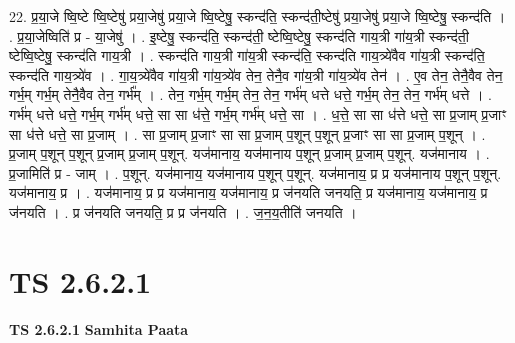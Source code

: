 \documentclass[17pt]{extarticle}
\begin{document}
22. प्र॒या॒जे ष्वि॒ष्टे ष्वि॒ष्टेषु॑ प्रया॒जेषु॑ प्रया॒जे ष्वि॒ष्टेषु॒ स्कन्द॑ति॒ स्कन्द॑ती॒ष्टेषु॑ प्रया॒जेषु॑ प्रया॒जे ष्वि॒ष्टेषु॒ स्कन्द॑ति । . प्र॒या॒जेष्विति॑ प्र - या॒जेषु॑ । . इ॒ष्टेषु॒ स्कन्द॑ति॒ स्कन्द॑ती॒ ष्टेष्वि॒ष्टेषु॒ स्कन्द॑ति गाय॒त्री गा॑य॒त्री स्कन्द॑ती॒ ष्टेष्वि॒ष्टेषु॒ स्कन्द॑ति गाय॒त्री । . स्कन्द॑ति गाय॒त्री गा॑य॒त्री स्कन्द॑ति॒ स्कन्द॑ति गाय॒त्र्ये॑वैव गा॑य॒त्री स्कन्द॑ति॒ स्कन्द॑ति गाय॒त्र्ये॑व । . गा॒य॒त्र्ये॑वैव गा॑य॒त्री गा॑य॒त्र्ये॑व तेन॒ तेनै॒व गा॑य॒त्री गा॑य॒त्र्ये॑व तेन॑ । . ए॒व तेन॒ तेनै॒वैव तेन॒ गर्भ॒म् गर्भ॒म् तेनै॒वैव तेन॒ गर्भ᳚म् । . तेन॒ गर्भ॒म् गर्भ॒म् तेन॒ तेन॒ गर्भ॑म् धत्ते धत्ते॒ गर्भ॒म् तेन॒ तेन॒ गर्भ॑म् धत्ते । . गर्भ॑म् धत्ते धत्ते॒ गर्भ॒म् गर्भ॑म् धत्ते॒ सा सा ध॑त्ते॒ गर्भ॒म् गर्भ॑म् धत्ते॒ सा । . ध॒त्ते॒ सा सा ध॑त्ते धत्ते॒ सा प्र॒जाम् प्र॒जाꣳ सा ध॑त्ते धत्ते॒ सा प्र॒जाम् । . सा प्र॒जाम् प्र॒जाꣳ सा सा प्र॒जाम् प॒शून् प॒शून् प्र॒जाꣳ सा सा प्र॒जाम् प॒शून् । . प्र॒जाम् प॒शून् प॒शून् प्र॒जाम् प्र॒जाम् प॒शून्. यज॑मानाय॒ यज॑मानाय प॒शून् प्र॒जाम् प्र॒जाम् प॒शून्. यज॑मानाय । . प्र॒जामिति॑ प्र - जाम् । . प॒शून्. यज॑मानाय॒ यज॑मानाय प॒शून् प॒शून्. यज॑मानाय॒ प्र प्र यज॑मानाय प॒शून् प॒शून्. यज॑मानाय॒ प्र । . यज॑मानाय॒ प्र प्र यज॑मानाय॒ यज॑मानाय॒ प्र ज॑नयति जनयति॒ प्र यज॑मानाय॒ यज॑मानाय॒ प्र ज॑नयति । . प्र ज॑नयति जनयति॒ प्र प्र ज॑नयति । . ज॒न॒य॒तीति॑ जनयति । \newline
\pagebreak
{}
\section*{ TS 2.6.2.1 }

\textbf{TS 2.6.2.1 } \newline
\textbf{Samhita Paata} \newline
\end{document}

